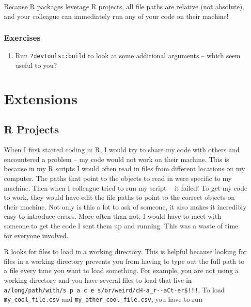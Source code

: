 \documentclass[
]{book}
\providecommand{\tightlist}{%
  \setlength{\itemsep}{0pt}\setlength{\parskip}{0pt}}
\begin{document}
Because R packages leverage R projects, all file paths are relative (not absolute), and your colleague can immediately run any of your code on their machine!

\hypertarget{ex-set9}{%
\subsection{Exercises}\label{ex-set9}}

\begin{enumerate}
\def\labelenumi{\arabic{enumi}.}
\tightlist
\item
  Run \texttt{?devtools::build} to look at some additional arguments -- which seem useful to you?
\end{enumerate}

\hypertarget{extensions}{%
\chapter{Extensions}\label{extensions}}

\hypertarget{r-projects}{%
\section{R Projects}\label{r-projects}}

When I first started coding in R, I would try to share my code with others and encountered a problem -- my code would not work on their machine. This is because in my R scripts I would often read in files from different locations on my computer. The paths that point to the objects to read in were specific to my machine. Then when I colleague tried to run my script -- it failed! To get my code to work, they would have edit the file paths to point to the correct objects on their machine. Not only is this a lot to ask of someone, it also makes it incredibly easy to introduce errors. More often than not, I would have to meet with someone to get the code I sent them up and running. This was a waste of time for everyone involved.

R looks for files to load in a working directory. This is helpful because looking for files in a working directory prevents you from having to type out the full path to a file every time you want to load something. For example, you are not using a working directory and you have several files to load that live in \texttt{a/long/path/with/s\ p\ a\ c\ e\ s/or/weird/cH-a\_r-\/-aCt-er\$!!!}. To load \texttt{my\_cool\_file.csv} and \texttt{my\_other\_cool\_file.csv}, you have to run
\end{document}

